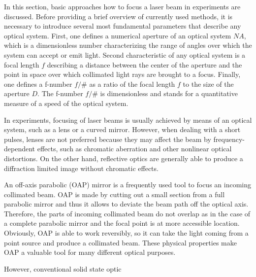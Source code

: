 In this section, basic approaches how to focus a laser beam in experiments are discussed. Before providing a brief overview of currently used methods, it is necessary to introduce several most fundamental parameters that describe any optical system. First, one defines a numerical aperture of an optical system $ N\!A $, which is a dimensionless number characterizing the range of angles over which the system can accept or emit light. Second characteristic of any optical system is a focal length $ f $ describing a distance between the center of the aperture and the point in space over which collimated light rays are brought to a focus. Finally, one defines a f-number $ f/\# $ as a ratio of the focal length $ f $ to the size of the aperture $ D $. The f-number $ f/\# $ is dimensionless and stands for a quantitative measure of a speed of the optical system.

In experiments, focusing of laser beams is usually achieved by means of an optical system, such as a lens or a curved mirror. However, when dealing with a short pulses, lenses are not preferred because they may affect the beam by frequency-dependent effects, such as chromatic aberration and other nonlinear optical distortions. On the other hand, reflective optics are generally able to produce a diffraction limited image without chromatic effects.

An off-axis parabolic (OAP) mirror is a frequently used tool to focus an incoming collimated beam. OAP is made by cutting out a small section from a full parabolic mirror and thus it allows to deviate the beam path off the optical axis. Therefore, the parts of incoming collimated beam do not overlap as in the case of a complete parabolic mirror and the focal point is at more accessible location. Obviously, OAP is able to work reversibly, so it can take the light coming from a point source and produce a collimated beam. These physical properties make OAP a valuable tool for many different optical purposes.

However, conventional solid state optic


